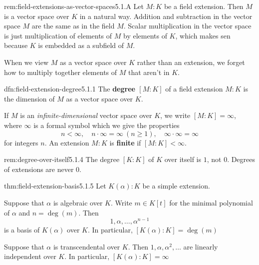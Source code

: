 \documentclass[landscape, 8pt]{extarticle}
\begin{document}
\begin{multicols}{3}
\begin{rem}{rem:field-extensions-as-vector-spaces}{5.1.A}
    Let $M : K$ be a field extension. Then $M$ is a vector space over $K$ in a natural way. Addition and subtraction in the vector space $M$ are the same as in the field $M$. Scalar multiplication in the vector space is just multiplication of elements of $M$ by elements of $K$, which makes sen because $K$ is embedded as a subfield of $M$.

    \longrule{0.08ex}
    When we view $M$ as a vector space over $K$ rather than an extension, we forget how to multiply together elements of $M$ that aren't in $K$.
\end{rem}

\begin{dfn}{dfn:field-extension-degree}{5.1.1}
    The \textbf{degree $[M : K]$} of a field extension $M : K$ is the dimension of $M$ as a vector space over $K$.

    If $M$ is an \textit{infinite-dimensional} vector space over $K$, we write $[M : K] = \infty$, where $\infty$ is a formal symbol which we give the properties
    \[n < \infty, \quad n \cdot \infty = \infty\:(n \ge 1), \quad \infty \cdot \infty = \infty\]
    for integers $n$. An extension $M : K$ is \textbf{finite} if $[M : K] < \infty$.
\end{dfn}

\begin{rem}{rem:degree-over-itself}{5.1.4}
    The degree $[K : K]$ of $K$ over itself is $1$, not $0$. Degrees of extensions are never $0$.
\end{rem}

\begin{thm}{thm:field-extension-basis}{5.1.5}
    Let $K(\alpha) : K$ be a simple extension.
    \begin{enumerate-zero}
        \item Suppose that $\alpha$ is algebraic over $K$. Write $m\in K[t]$ for the minimal polynomial of $\alpha$ and $n = \deg(m)$. Then
            \[1,\alpha,\dots,\alpha^{n-1}\]
            is a basis of $K(\alpha)$ over $K$. In particular, $[K(\alpha) : K] = \deg(m)$
        \item Suppose that $\alpha$ is transcendental over $K$. Then $1,\alpha,\alpha^{2},\dots$ are linearly independent over $K$. In particular, $[K(\alpha) : K] = \infty$
    \end{enumerate-zero}
\end{thm}


\end{multicols}
\end{document}
